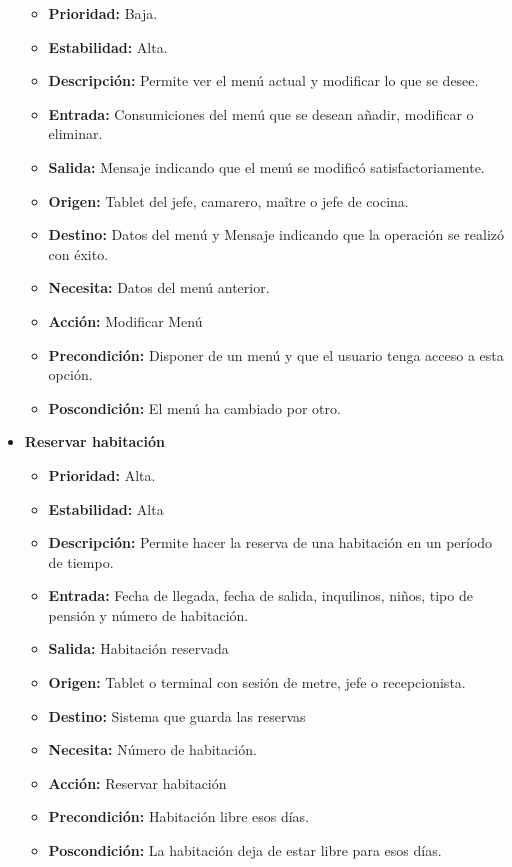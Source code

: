 \documentclass[spanish,a4paper,11pt, twoside]{report}	%
\begin{document}
\begin{itemize}
		\begin{itemize}
			\item \textbf{Prioridad: } Baja.
			\item \textbf{Estabilidad: } Alta.
			\item \textbf{Descripción: } Permite ver el menú actual y modificar lo que se desee.
			\item \textbf{Entrada: } Consumiciones del menú que se desean añadir, modificar o eliminar.
			\item \textbf{Salida: } Mensaje indicando que el menú se modificó satisfactoriamente.
			\item \textbf{Origen: } Tablet del jefe, camarero, maître o jefe de cocina.
			\item \textbf{Destino: } Datos del menú y Mensaje indicando que la operación se realizó con éxito.
			\item \textbf{Necesita: } Datos del menú anterior.
			\item \textbf{Acción: } Modificar Menú
			\item \textbf{Precondición: } Disponer de un menú y que el usuario tenga acceso a esta opción.
			\item \textbf{Poscondición: } El menú ha cambiado por otro.

		\end{itemize}%

		\item \textbf{Reservar habitación} 

		\begin{itemize}

			\item \textbf{Prioridad: } Alta.
			\item \textbf{Estabilidad: }Alta
			\item \textbf{Descripción: }Permite hacer la reserva de una habitación en un período de tiempo.
			\item \textbf{Entrada: } Fecha de llegada, fecha de salida, inquilinos, niños, tipo de pensión y número de habitación.
			\item \textbf{Salida: } Habitación reservada
			\item \textbf{Origen: } Tablet o terminal con sesión de metre, jefe o recepcionista.
			\item \textbf{Destino: } Sistema que guarda las reservas
			\item \textbf{Necesita: } Número de habitación.
			\item \textbf{Acción: } Reservar habitación
			\item \textbf{Precondición: } Habitación libre esos días.
			\item \textbf{Poscondición: } La habitación deja de estar libre para esos días.


\end{itemize}
\end{itemize}
\end{document}
